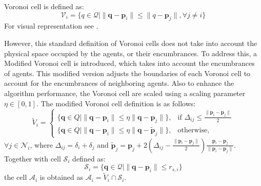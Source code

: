         Voronoi cell is defined as: 
        \begin{equation}
            \mathcal{V}_i = \{q \in \mathcal{Q} \lvert \lVert \mathbf{q} - \mathbf{p}_i \rVert \leq \lVert q - \mathbf{p}_j \rVert, \forall j \neq i\}
        \end{equation}
        For visual representation see . 

        However, this standard definition of Voronoi cells does not take into account the physical space occupied by the agents, or their encumbrances. 
        To address this, a Modified Voronoi cell is introduced, which takes into account the encumbrances of agents.
        This modified version adjusts the boundaries of each Voronoi cell to account for the encumbrances of neighboring agents.
        Also to enhance the algorithm performance, the Voronoi cell are scaled using a scaling parameter $\eta \in [0, 1]$.
        The modified Voronoi cell definition is as follows:
        \begin{equation}
            \label{eq:voronoi_cell_account_encum}
            \tilde{V}_i = 
            \begin{cases}
            \{ \mathbf{q} \in Q \mid \| \mathbf{q} - \mathbf{p}_i \| \leq \eta \| \mathbf{q} - \mathbf{p}_j \| \}, & \text{if } \Delta_{ij} \leq \frac{\| \mathbf{p}_i - \mathbf{p}_j \|}{2} \\
            \{ \mathbf{q} \in Q \mid \| \mathbf{q} - \mathbf{p}_i \| \leq \eta \| \mathbf{q} - \tilde{\mathbf{p}}_j \| \}, & \text{otherwise},
            \end{cases}
        \end{equation}
        $\forall j \in \mathcal{N}_i$, where $\Delta_{ij} = \delta_i + \delta_j$ and $\tilde{\mathbf{p}}_j = \mathbf{p}_j + 2(\Delta_{ij} - \frac{\| \mathbf{p}_i - \mathbf{p}_j \|}{2})\frac{ \mathbf{p}_i - \mathbf{p}_j }{\| \mathbf{p}_i - \mathbf{p}_j \|}$.
        Together with cell $\mathcal{S}_i$ defined as: 
        \begin{equation}
            \mathcal{S}_i = \{\mathbf{q} \in \mathcal{Q} | \| \mathbf{q} - \mathbf{p}_i \| \leq r_{s,i}\}
        \end{equation}
        the cell $\mathcal{A}_i$ is obtained as $\mathcal{A}_i = \tilde{V}_i \cap \mathcal{S}_i$.

